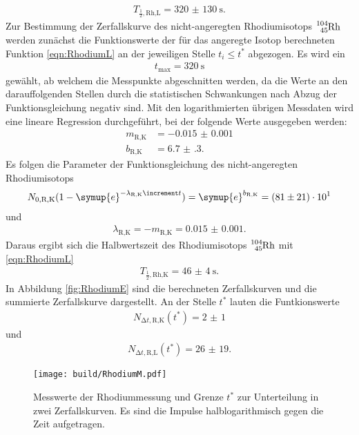 \begin{align}
  T_{\frac{1}{2},\text{Rh,L}} = \SI{320(130)}{\second}.
\end{align}
Zur Bestimmung der Zerfallskurve des nicht-angeregten Rhodiumisotops
$\ce{^{104}_{45}Rh}$ werden zunächst die Funktionswerte der für das angeregte
Isotop berechneten Funktion \eqref{eqn:RhodiumL} an der jeweiligen Stelle
$t_i \leq t^*$
abgezogen.
Es wird ein
\begin{align}
  t_\text{max} = \SI{320}{\second}
\end{align}
gewählt, ab welchem die Messpunkte abgeschnitten werden, da die Werte an den
darauffolgenden Stellen durch die statistischen Schwankungen nach Abzug
der Funktionsgleichung negativ sind.
Mit den logarithmierten übrigen Messdaten wird eine lineare Regression
durchgeführt, bei der folgende Werte ausgegeben werden:
\begin{align}
  m_\text{R,K} & = -\num{0.015(1)} \\
  b_\text{R,K} & = \num{6.7(3)}.
\end{align}
Es folgen die Parameter der Funktionsgleichung des nicht-angeregten
Rhodiumisotops
\begin{align}
  N_\text{0,R,K}(1-\symup{e}^{-\lambda_\text{R,K}\increment t}) =
  \symup{e}^{b_\text{R,K}} = \num{81(21)e1}
\end{align}
und
\begin{align}
  \lambda_\text{R,K} = -m_\text{R,K} = \num{0.015(1)}.
\end{align}
Daraus ergibt sich die Halbwertszeit des Rhodiumisotops $\ce{^{104}_{45}Rh}$
mit \eqref{eqn:RhodiumL}
\begin{align}
  T_{\frac{1}{2},\text{Rh,K}} = \SI{46(4)}{\second}.
\end{align}
In Abbildung \ref{fig:RhodiumE} sind die berechneten Zerfallskurven und die
summierte Zerfallskurve dargestellt.
An der Stelle $t^*$ lauten die
Funtkionswerte
\begin{align}
  N_{\increment t,\text{R,K}} (t^*) = \num{2(1)}
\end{align}
und
\begin{align}
  N_{\increment t,\text{R,L}} (t^*) = \num{26(19)}.
\end{align}

\begin{figure}
  \centering
  \texttt{[image: build/RhodiumM.pdf]}
  \caption{Messwerte der Rhodiummessung und Grenze $t^*$ zur Unterteilung in
  zwei Zerfallskurven. Es sind die Impulse halblogarithmisch gegen die Zeit
  aufgetragen.}
  \label{fig:RhodiumM}
\end{figure}

